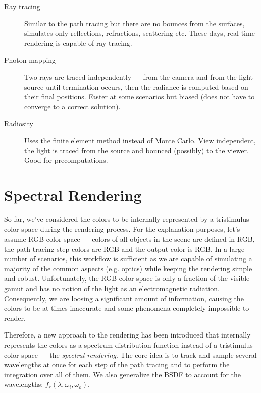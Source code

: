 \begin{description}
	\item[Ray tracing]\cite{glassner1989introduction} Similar to the path tracing but there are no bounces from the surfaces, simulates only reflections, refractions, scattering etc. These days, real-time rendering is capable of ray tracing.
	\item[Photon mapping]\cite{jensen2001realistic} Two rays are traced independently --- from the camera and from the light source until termination occurs, then the radiance is computed based on their final positions. Faster at some scenarios but biased (does not have to converge to a correct solution).
	\item[Radiosity]\cite{sillion1994radiosity}Uses the finite element method instead of Monte Carlo. View independent, the light is traced from the source and bounced (possibly) to the viewer. Good for precomputations. 
\end{description}

\section{Spectral Rendering}

So far, we've considered the colors to be internally represented by a tristimulus color space during the rendering process. For the explanation purposes, let's assume RGB color space --- colors of all objects in the scene are defined in RGB, the path tracing step colors are RGB and the output color is RGB. In a large number of scenarios, this workflow is sufficient as we are capable of simulating a majority of the common aspects (e.g. optics) while keeping the rendering simple and robust. Unfortunately, the RGB color space is only a fraction of the visible gamut and has no notion of the light as an electromagnetic radiation. Consequently, we are loosing a significant amount of information, causing the colors to be at times inaccurate and some phenomena completely impossible to render. 

Therefore, a new approach to the rendering has been introduced that internally represents the colors as a spectrum distribution function instead of a tristimulus color space --- the \emph{spectral rendering}. The core idea is to track and sample several wavelengths at once for each step of the path tracing and to perform the integration over all of them. We also generalize the BSDF to account for the wavelengths: $f_r(\lambda,\omega_i,\omega_o)$.

